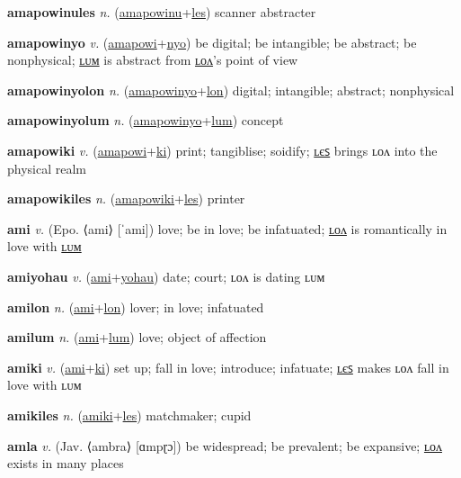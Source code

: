 \textbf{\hypertarget{amapowinules}{amapowinules}} \textit{n.} (\hyperlink{amapowinu}{amapowinu}+\allowbreak \hyperlink{les}{les})
scanner abstracter

\textbf{\hypertarget{amapowinyo}{amapowinyo}} \textit{v.} (\hyperlink{amapowi}{amapowi}+\allowbreak \hyperlink{nyo}{nyo})
be digital; be intangible; be abstract; be nonphysical; \hyperlink{amapowinyolum}{ʟᴜᴍ} is abstract from \hyperlink{amapowinyolon}{ʟᴏᴧ}’s point of view

\textbf{\hypertarget{amapowinyolon}{amapowinyolon}} \textit{n.} (\hyperlink{amapowinyo}{amapowinyo}+\allowbreak \hyperlink{lon}{lon})
digital; intangible; abstract; nonphysical

\textbf{\hypertarget{amapowinyolum}{amapowinyolum}} \textit{n.} (\hyperlink{amapowinyo}{amapowinyo}+\allowbreak \hyperlink{lum}{lum})
concept

\textbf{\hypertarget{amapowiki}{amapowiki}} \textit{v.} (\hyperlink{amapowi}{amapowi}+\allowbreak \hyperlink{ki}{ki})
print; tangiblise; soidify; \hyperlink{amapowikiles}{ʟєꜱ} brings ʟᴏᴧ into the physical realm

\textbf{\hypertarget{amapowikiles}{amapowikiles}} \textit{n.} (\hyperlink{amapowiki}{amapowiki}+\allowbreak \hyperlink{les}{les})
printer

\textbf{\hypertarget{ami}{ami}} \textit{v.} (Epo. ⟨ami⟩ [ˈami])
love; be in love; be infatuated; \hyperlink{amilon}{ʟᴏᴧ} is romantically in love with \hyperlink{amilum}{ʟᴜᴍ}

\textbf{\hypertarget{amiyohau}{amiyohau}} \textit{v.} (\hyperlink{ami}{ami}+\allowbreak \hyperlink{yohau}{yohau})
date; court; ʟᴏᴧ is dating ʟᴜᴍ

\textbf{\hypertarget{amilon}{amilon}} \textit{n.} (\hyperlink{ami}{ami}+\allowbreak \hyperlink{lon}{lon})
lover; in love; infatuated

\textbf{\hypertarget{amilum}{amilum}} \textit{n.} (\hyperlink{ami}{ami}+\allowbreak \hyperlink{lum}{lum})
love; object of affection

\textbf{\hypertarget{amiki}{amiki}} \textit{v.} (\hyperlink{ami}{ami}+\allowbreak \hyperlink{ki}{ki})
set up; fall in love; introduce; infatuate; \hyperlink{amikiles}{ʟєꜱ} makes ʟᴏᴧ fall in love with ʟᴜᴍ

\textbf{\hypertarget{amikiles}{amikiles}} \textit{n.} (\hyperlink{amiki}{amiki}+\allowbreak \hyperlink{les}{les})
matchmaker; cupid

\textbf{\hypertarget{amla}{amla}} \textit{v.} (Jav. ⟨ambra⟩ [ɑmpɽɔ])
be widespread; be prevalent; be expansive; \hyperlink{amlalon}{ʟᴏᴧ} exists in many places


